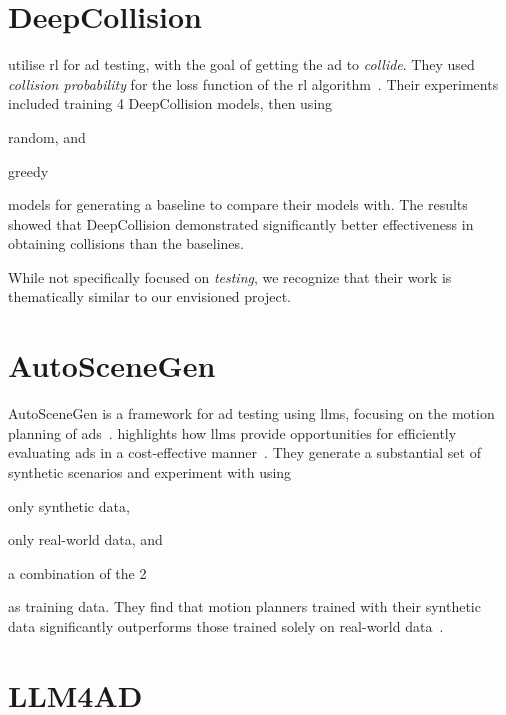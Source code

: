 \section{DeepCollision}

\citeauthor{deepCollision} utilise \acrfull{rl} for \acrshort{ad} testing, with the goal of getting
the \acrshort{ad} to \textit{collide}. They used \textit{collision probability} for the loss
function of the \acrlong{rl} algorithm~\cite[384]{deepCollision}. Their experiments included
training 4 DeepCollision models, then using \begin{inparaenum}
    \item random, and
    \item greedy
\end{inparaenum} models for generating a baseline to compare their models with. The results showed
that DeepCollision demonstrated significantly better effectiveness in obtaining collisions than the
baselines.

\begin{Note}
    While not specifically focused on \textit{testing}, we recognize that their work is thematically
    similar to our envisioned project.
\end{Note}

\section{AutoSceneGen}

AutoSceneGen is a framework for \acrshort{ad} testing using \acrshort{llms},
focusing on the motion planning of \acrlong{ads}~\cite[14539]{autoSceneGen}.
\citeauthor{autoSceneGen} highlights how \acrshort{llms} provide opportunities
for efficiently evaluating \acrshort{ads} in a cost-effective
manner~\cite[14539-14540]{autoSceneGen}. They generate a substantial set of synthetic scenarios and
experiment with using \begin{inparaenum}
    \item only synthetic data,
    \item only real-world data, and
    \item a combination of the \num{2} \end{inparaenum} as training data. They find that motion
planners trained with their synthetic data significantly outperforms those trained solely on
real-world data~\cite[14539]{autoSceneGen}.

\section{LLM4AD}

